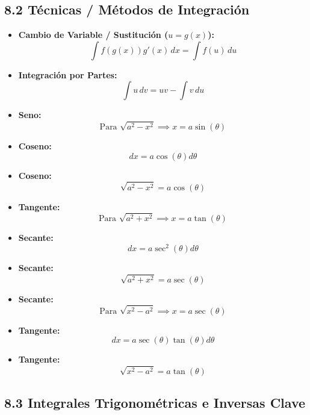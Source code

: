 \documentclass[11pt,a4paper]{article}
\begin{document}
\subsection*{8.2 Técnicas / Métodos de Integración}

\begin{itemize}
  \item \textbf{Cambio de Variable / Sustitución ($u = g(x)$):}
  \[
    \int f(g(x))g'(x) \, dx = \int f(u) \, du
  \]
  \item \textbf{Integración por Partes:}
  \[
    \int u \, dv = u v - \int v \, du
  \]
  \item \textbf{Seno:}
  \[
    \text{Para } \sqrt{a^2 - x^2} \implies x = a\sin(\theta)
  \]
  \item \textbf{Coseno:}
  \[
    dx = a\cos(\theta) d\theta
  \]
  \item \textbf{Coseno:}
  \[
    \sqrt{a^2 - x^2} = a\cos(\theta)
  \]
  \item \textbf{Tangente:}
  \[
    \text{Para } \sqrt{a^2 + x^2} \implies x = a\tan(\theta)
  \]
  \item \textbf{Secante:}
  \[
    dx = a\sec^2(\theta) d\theta
  \]
  \item \textbf{Secante:}
  \[
    \sqrt{a^2 + x^2} = a\sec(\theta)
  \]
  \item \textbf{Secante:}
  \[
    \text{Para } \sqrt{x^2 - a^2} \implies x = a\sec(\theta)
  \]
  \item \textbf{Tangente:}
  \[
    dx = a\sec(\theta)\tan(\theta) d\theta
  \]
  \item \textbf{Tangente:}
  \[
    \sqrt{x^2 - a^2} = a\tan(\theta)
  \]
\end{itemize}

\subsection*{8.3 Integrales Trigonométricas e Inversas Clave}
\end{document}
